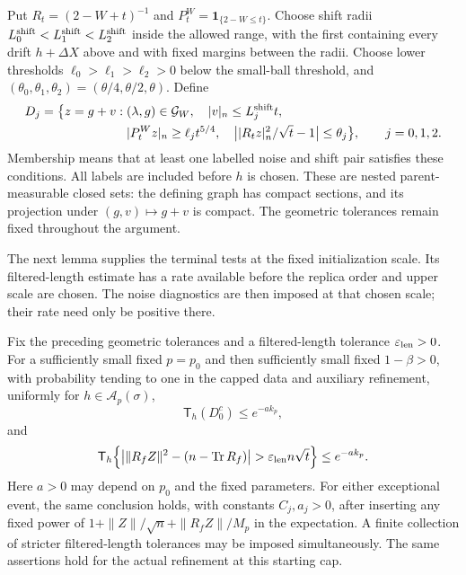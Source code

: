 Put $R_t=(2-W+t)^{-1}$ and $P_t^W=\mathbf1_{\{2-W\le t\}}$.
Choose shift radii $L_0^{\rm shift}<L_1^{\rm shift}<L_2^{\rm shift}$
inside the allowed range, with the first containing every drift
$h+\Delta X$ above and with fixed margins between the radii. Choose lower
thresholds $\ell_0>\ell_1>\ell_2>0$ below the small-ball threshold, and
$(\theta_0,\theta_1,\theta_2)=(\theta/4,\theta/2,\theta)$. Define
\begin{equation}\label{cap:terminal-regions}
\begin{split}
 D_j=\bigl\{z=g+v:\;&(\lambda,g)\in\mathcal G_W,\quad
 |v|_n\le L_j^{\rm shift}t,\\
 &|P_t^Wz|_n\ge\ell_jt^{5/4},\quad
 \bigl||R_tz|_n^2/\sqrt t-1\bigr|\le\theta_j\bigr\},
 \qquad j=0,1,2.
\end{split}
\end{equation}
Membership means that at least one labelled noise and shift pair satisfies
these conditions. All labels are included before $h$ is chosen. These are
nested parent-measurable closed sets: the defining graph has compact
sections, and its projection under $(g,v)\mapsto g+v$ is compact.
The geometric tolerances remain fixed throughout the argument.

The next lemma supplies the terminal tests at the fixed initialization
scale. Its filtered-length estimate has a rate available before the replica
order and upper scale are chosen. The noise diagnostics are then imposed at
that chosen scale; their rate need only be positive there.

\begin{lemma}
\label{cap:marked-terminal-tests}
Fix the preceding geometric tolerances and a filtered-length tolerance
$\varepsilon_{\rm len}>0$. For a sufficiently small fixed $p=p_0$ and
then sufficiently small fixed $1-\beta>0$, with probability tending to one
in the capped data and auxiliary refinement, uniformly for
$h\in\mathcal A_p(\sigma)$,
\begin{equation}\label{cap:terminal-test-input}
 \mathsf T_h(D_0^c)\le e^{-a k_p},
\end{equation}
and
\begin{equation}\label{cap:terminal-filtered-test}
 \mathsf T_h\!\left\{
 \left|\|R_fZ\|^2-(n-\operatorname{Tr}R_f)\right|
       >\varepsilon_{\rm len}n\sqrt t\right\}\le e^{-a k_p}.
\end{equation}
Here $a>0$ may depend on $p_0$ and the fixed parameters. For either
exceptional event, the same conclusion holds, with constants $C_j,a_j>0$,
after inserting any fixed power of
$1+\|Z\|/\sqrt n+\|R_fZ\|/M_p$ in the expectation. A finite collection
of stricter filtered-length tolerances may be imposed simultaneously.
The same assertions hold for the actual refinement at this starting cap.
\end{lemma}

